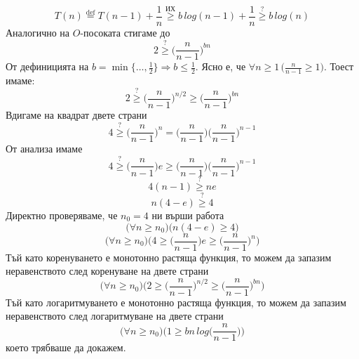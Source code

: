 \begin{solution}
\begin{itemize}
\begin{indstep}
			\begin{equation*}
				T(n)\overset{\text{def}}{=}T(n-1)+\frac1n\overset{\text{ИХ}}{\ge}b\,log(n-1)+\frac1n\overset{?}{\ge}b\,log(n)
			\end{equation*}
			Аналогично на $O$-посоката стигаме до
			\begin{equation*}
				2\overset{?}{\ge}\bigg(\frac{n}{n-1}\bigg)^{bn}
			\end{equation*}
			От дефиницията на $b=\min\{\dots,\frac12\}\Rightarrow b\le\frac12$. Ясно е, че $\forall n\ge1\,\big(\frac{n}{n-1}\ge1\big)$. Тоест имаме:
			\begin{equation*}
				2\overset{?}{\ge}\bigg(\frac{n}{n-1}\bigg)^{n/2}\ge\bigg(\frac{n}{n-1}\bigg)^{bn}
			\end{equation*}
			Вдигаме на квадрат двете страни
			\begin{equation*}
				4\overset{?}{\ge}\bigg(\frac{n}{n-1}\bigg)^n=\bigg(\frac{n}{n-1}\bigg)\bigg(\frac{n}{n-1}\bigg)^{n-1}
			\end{equation*}
			От анализа имаме
			\begin{equation*}
				4\overset{?}{\ge}\bigg(\frac{n}{n-1}\bigg)e\ge\bigg(\frac{n}{n-1}\bigg)\bigg(\frac{n}{n-1}\bigg)^{n-1}
			\end{equation*}
			\begin{equation*}
				4(n-1)\overset{?}{\ge}ne
			\end{equation*}
			\begin{equation*}
				n(4-e)\overset{?}{\ge}4
			\end{equation*}
			Директно проверяваме, че $n_0=4$ ни върши работа
			\begin{equation*}
				\big(\forall n\ge n_0\big)\big(n(4-e)\ge4\big)
			\end{equation*}
			\begin{equation*}
				\big(\forall n\ge n_0\big)\Bigg(4\ge\bigg(\frac{n}{n-1}\bigg)e\ge\bigg(\frac{n}{n-1}\bigg)^n\Bigg)
			\end{equation*}
			Тъй като коренуването е монотонно растяща функция, то можем да запазим неравенството след коренуване на двете страни
			\begin{equation*}
				\big(\forall n\ge n_0\big)\Bigg(2\ge\bigg(\frac{n}{n-1}\bigg)^{n/2}\ge\bigg(\frac{n}{n-1}\bigg)^{bn}\Bigg)
			\end{equation*}
			Тъй като логаритмуването е монотонно растяща функция, то можем да запазим неравенството след логаритмуване на двете страни
			\begin{equation*}
				\big(\forall n\ge n_0\big)\Bigg(1\ge bn\,log\bigg(\frac{n}{n-1}\bigg)\Bigg)
			\end{equation*}
			което трябваше да докажем.
		\end{indstep}
	\end{itemize}
\end{solution}

